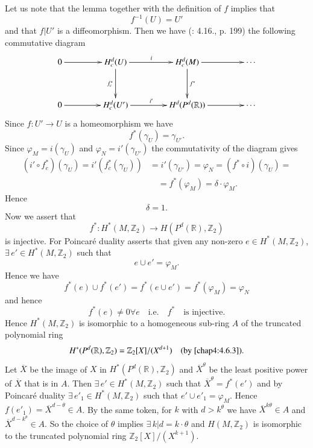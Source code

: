 Let us note that the lemma together with the definition of $f$ implies
that
$$
f^{-1}(U)=U'
$$
and that $f|U'$ is a diffeomorphism. Then we have (\cite{12}: 4.16.,
p. 199) the following commutative diagram
\[
\xymatrix@C=1.5cm@R=1.2cm{
0\ar[r] & H^{d}_{c}(U)\ar[d]_{f^{\ast}_{c}}\ar[r]^{i} &
H^{d}_{c}(M)\ar[d]^{f^{\ast}}\ar[r] & \cdots\\
0\ar[r] & H^{d}_{c}(U')\ar[r]^{i'} & H^{d}(P^{d}(\mathbb{R}))\ar[r] & \cdots
}
\]
Since $f:U'\to U$ is a homeomorphism we have
$$
f^{\ast}(\gamma_{U})=\gamma_{U'}.
$$
Since $\varphi_{M}=i(\gamma_{U})$ and $\varphi_{N}=i'(\gamma_{U'})$
the commutativity of the diagram gives
\begin{align*}
(i'\circ f^{\ast}_{c})(\gamma_{U})=i'(f^{\ast}_{c}(\gamma_{U})) &=
  i'(\gamma_{U'})=\varphi_{N}=(f^{\ast}\circ i)(\gamma_{U})=\\
&\quad =f^{\ast}(\varphi_{M})=\delta\cdot \varphi_{M}.
\end{align*}
Hence 
$$
\delta=1.
$$
Now we assert that
$$
f^{\ast}:H^{\ast}(M,\mathbb{Z}_{2})\to
H(P^{d}(\mathbb{R}),\mathbb{Z}_{2})
$$
is injective. For \pageoriginale Poincar\'e duality asserts that given
any non-zero $e\in H^{\ast}(M,\mathbb{Z}_{2})$, $\exists\, e'\in
H^{\ast}(M,\mathbb{Z}_{2})$ such that
$$
e\cup e'=\varphi_{M}.
$$
Hence we have
$$
f^{\ast}(e)\cup f^{\ast}(e')=f^{\ast}(e\cup
e')=f^{\ast}(\varphi_{M})=\varphi_{N}
$$
and hence
$$
f^{\ast}(e)\neq 0\forall e\quad\text{i.e.}\quad f^{\ast}\quad\text{is
  injective.}
$$
Hence $H^{\ast}(M,\mathbb{Z}_{2})$ is isomorphic to a homogeneous
sub-ring $A$ of the truncated polynomial ring
$$
H^{\ast}(P^{d}(\mathbb{R}),\mathbb{Z}_{2})=\mathbb{Z}_{2}[X]/(X^{d+1})\quad\text{(by
\eqref{chap4:4.6.3}).}
$$
Let $\overline{X}$ be the image of $X$ in
$H^{\ast}(P^{d}(\mathbb{R}),\mathbb{Z}_{2})$ and
$\overline{X}^{\theta}$ be the least positive power of $\overline{X}$
that is in $A$. Then $\exists\, e'\in H^{\ast}(M,\mathbb{Z}_{2})$ such
that $\overline{X}^{\theta}=f^{\ast}(e')$ and by Poincar\'e duality
$\exists\, e'_{1}\in H^{\ast}(M,\mathbb{Z}_{2})$ such that $e'\cup
e'_{1}=\varphi_{M}$. Hence $f(e'_{1})=\overline{X}^{d-\theta}\in
A$. By the same token, for $k$ with $d>k^{\theta}$ we have
$\overline{X}^{k\theta}\in A$ and $\overline{X}^{d-k^{\theta}}\in
A$. So the choice of $\theta$ implies $\exists\, k|d=k\cdot\theta$ and
$H(M,\mathbb{Z}_{2})$ is isomorphic to the truncated polynomial ring
$\mathbb{Z}_{2}[X]/(X^{k+1})$.

\setcounter{subsection}{8}
\subsection{}\label{chap4:4.6.9}


